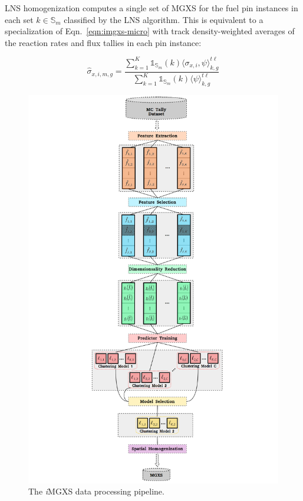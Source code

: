 \documentclass[12pt,twoside]{mitthesis-exec}
\begin{document}
LNS homogenization computes a single set of MGXS for the fuel pin instances in each set $k \in \mathbb{S}_{m}$ classified by the LNS algorithm. This is equivalent to a specialization of Eqn.~\ref{eqn:imgxs-micro} with track density-weighted averages of the reaction rates and flux tallies in each pin instance:

\begin{equation}
\label{eqn:imgxs-micro}
\hat{\sigma}_{x,i,m,g} = \frac{\displaystyle\sum\limits_{k=1}^{K}\mathbb{1}_{\mathbb{S}_{m}}(k) \langle \sigma_{x,i}, \psi \rangle_{k,g}^{t\ell}}{\displaystyle\sum\limits_{k=1}^{K}\mathbb{1}_{\mathbb{S}_{m}}(k) \langle \psi \rangle_{k,g}^{t\ell}}
\end{equation}

\begin{figure}[h!]
\centering
\includegraphics[width=0.9\linewidth]{figures/unsupervised/features/engineering/flow-chart}
\vspace{2mm}
\caption[\textit{i}MGXS flow chart]{The \textit{i}MGXS data processing pipeline.}
\label{fig:imgxs-flow-chart}
\end{figure}
\end{document}
